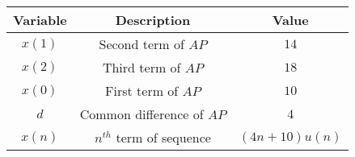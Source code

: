 \begin{tabular}{|c|c|c|} 
      \hline
\textbf{Variable}& \textbf{Description}& \textbf{Value}\\\hline
        $x(1)$& Second term of $AP$ & $14$ \\ \hline
        $x(2)$ &Third term of $AP$ & $18$ \\ \hline
         $x(0)$ & First term of $AP$ & $10$ \\ \hline
         $d$ & Common difference of $AP$ & $4$ \\ \hline
          $x(n)$& $n^{th}$ term of sequence& $(4n+10)u(n)$\\ \hline 
          
    \end{tabular}
